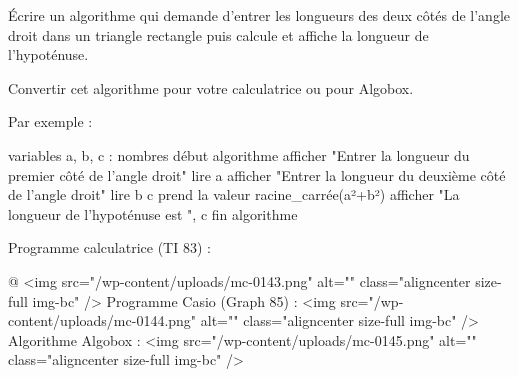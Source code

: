 
%
Écrire un algorithme qui demande d'entrer les longueurs des deux côtés de l'angle droit dans un triangle rectangle puis calcule et affiche la longueur de l'hypoténuse.
\par
Convertir cet algorithme pour votre calculatrice ou pour Algobox.
\begin{corrige}
     Par exemple :
\begin{code}
variables
   a, b, c : nombres
début algorithme
   afficher "Entrer la longueur du premier côté de l'angle droit"
   lire a
   afficher "Entrer la longueur du deuxième côté de l'angle droit"
   lire b
   c prend la valeur racine_carrée(a²+b²)
   afficher "La longueur de l'hypoténuse est ", c
fin algorithme
\end{code}
     Programme calculatrice (TI 83) :

\begin{center}

\end{center}@
     <img src="/wp-content/uploads/mc-0143.png" alt="" class="aligncenter size-full  img-bc" />
     Programme Casio (Graph 85) :
     <img src="/wp-content/uploads/mc-0144.png" alt="" class="aligncenter size-full  img-bc" />
     Algorithme Algobox :
     <img src="/wp-content/uploads/mc-0145.png" alt="" class="aligncenter size-full  img-bc" />
\end{corrige}
